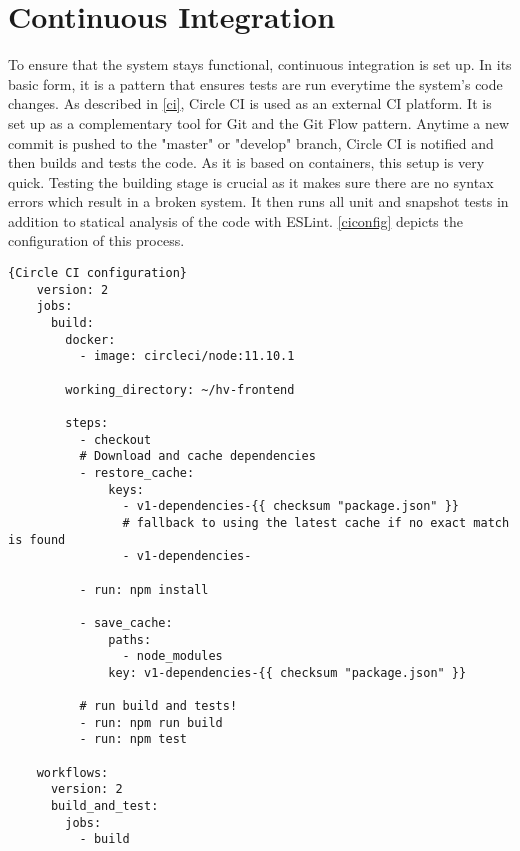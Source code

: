 \section{Continuous Integration}
To ensure that the system stays functional, continuous integration is set up. In its basic form, it is a pattern that ensures tests are run everytime the system's code changes. As described in \autoref{ci}, Circle CI is used as an external CI platform. It is set up as a complementary tool for Git and the Git Flow pattern. Anytime a new commit is pushed to the "master" or "develop" branch, Circle CI is notified and then builds and tests the code. As it is based on containers, this setup is very quick. Testing the building stage is crucial as it makes sure there are no syntax errors which result in a broken system. It then runs all unit and snapshot tests in addition to statical analysis of the code with ESLint. \autoref{ciconfig} depicts the configuration of this process. \newline

\begin{lstlisting}[caption=Circle CI configuration, captionpos=b, style=htmlcssjs, label=ciconfig]{Circle CI configuration}
    version: 2
    jobs:
      build:
        docker:
          - image: circleci/node:11.10.1
    
        working_directory: ~/hv-frontend
    
        steps:
          - checkout
          # Download and cache dependencies
          - restore_cache:
              keys:
                - v1-dependencies-{{ checksum "package.json" }}
                # fallback to using the latest cache if no exact match is found
                - v1-dependencies-
    
          - run: npm install
    
          - save_cache:
              paths:
                - node_modules
              key: v1-dependencies-{{ checksum "package.json" }}
    
          # run build and tests!
          - run: npm run build
          - run: npm test
    
    workflows:
      version: 2
      build_and_test:
        jobs:
          - build
    
    
  \end{lstlisting}